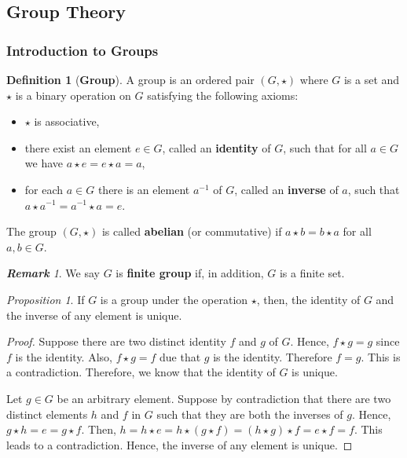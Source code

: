 \documentclass[paper=a4, fontsize=11pt]{scrartcl}
\numberwithin{equation}{section}		%
\numberwithin{figure}{section}			%
\numberwithin{table}{section}				%
\theoremstyle{definition}
\newtheorem{definition}{Definition}[section]
\theoremstyle{remark}
\newtheorem*{remark}{\textbf{Remark}}
\theoremstyle{example}
\newtheorem{prop}{Proposition}[section]
\begin{document}
\newpage
\subsection{Group Theory}

\subsubsection{Introduction to Groups}

\begin{definition}[\textbf{Group}]
    A group is an ordered pair $(G,\star)$ where $G$ is a set and $\star$ is a binary operation on $G$ satisfying the following axioms:
    \begin{itemize}
        \item $\star$ is associative,
        \item there exist an element $e \in G$, called an \textbf{identity} of $G$, such that for all $a \in G$ we have $a \star e = e \star a = a$,
        \item for each $a \in G$ there is an element $a^{-1}$ of $G$, called an \textbf{inverse} of $a$, such that $a \star a^{-1} = a^{-1} \star a = e$.
    \end{itemize}
    The group $(G,\star)$ is called \textbf{abelian} (or commutative) if $a \star b = b \star a$ for all $a,b \in G$.
\end{definition}

\begin{remark}
    We say $G$ is \textbf{finite group} if, in addition, $G$ is a finite set.
\end{remark}

\begin{prop}
    If $G$ is a group under the operation $\star$, then, the identity of $G$ and the inverse of any element is unique. 
\end{prop}

\begin{proof}
    Suppose there are two distinct identity $f$ and $g$ of $G$. Hence, $f\star g = g$ since $f$ is the identity. Also, $f\star g = f$ due that $g$ is the identity. Therefore $f = g$. This is a contradiction. Therefore, we know that the identity of $G$ is unique. 
    
    Let $g \in G$ be an arbitrary element. Suppose by contradiction that there are two distinct elements $h$ and $f$ in $G$ such that they are both the inverses of $g$. Hence, $g \star h = e = g \star f$. Then, $h = h \star e = h \star (g \star f) = (h \star g) \star f = e \star f = f$. This leads to a contradiction. Hence, the inverse of any element is unique.
\end{proof}
\end{document}

